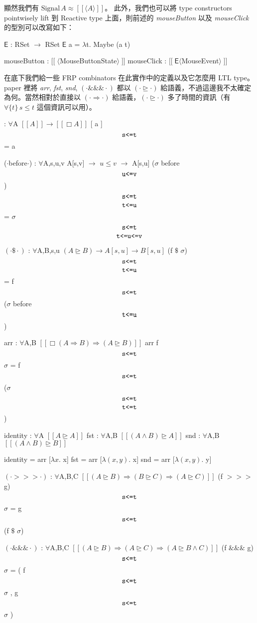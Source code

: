 \documentclass{article}
\newcommand{\llens}{[\![}
\newcommand{\rlens}{]\!]}
\newcommand{\TE}{\mathsf{E}}
\newcommand{\Wit}[1]{$\,\text{\texttt{#1}}\,$}
\newcommand{\Gs}{\sigma}
\newcommand{\Gl}{\lambda}
\begin{document}
  顯然我們有 $\text{Signal}\,A\approx \llens\langle A\rangle\rlens$。
  此外，我們也可以將 type constructors pointwisely lift 到 Reactive type
  上面，則前述的 \textit{mouseButton} 以及 \textit{mouseClick} 的型別可以改寫如下：

  \begin{code}
  $\TE$ : RSet $\to$ RSet
  $\TE$ a = $\Gl$t. Maybe (a t)

  mouseButton : $\llens\;\langle$MouseButtonState$\rangle\;\rlens$
  mouseClick   : $\llens\;\TE\langle$MouseEvent$\rangle\;\rlens$
  \end{code}

  在底下我們給一些 FRP combinators 在此實作中的定義以及它怎麼用 LTL type。
  paper 裡將 \textit{arr}, \textit{fst}, \textit{snd}, $(\cdot\&\!\&\!\&\cdot)$
  都以 $(\cdot\unrhd\cdot)$ 給語義，不過這邊我不太確定為何。當然相對於直接以
  $(\cdot\Rightarrow\cdot)$ 給語義，$(\cdot\unrhd\cdot)$ 多了時間的資訊（有
  $\forall\{t\}\,s\le t$ 這個資訊可以用）。

  \begin{minipage}[t]{\textwidth}
    \begin{minipage}[t]{0.46\textwidth}
      \begin{code}
[$\cdot$] : $\forall${A} $\llens A\rlens \to \llens\Box A\rlens$
[ a ] $\Wit{s<=t}$ = a

($\cdot$before$\cdot$) : $\forall${A,s,u,v} A[s,v] $\to$ $u\le v$ $\to$ A[s,u]
($\Gs$ before $\Wit{u<=v}$) $\Wit{s<=t}$ $\Wit{t<=u}$ = $\Gs$ $\Wit{s<=t}$ $\Wit{t<=u<=v}$

$(\cdot\$\cdot)$ : $\forall${A,B,s,u} $(A\unrhd B)\to A[s,u] \to B[s,u]$
(f $\$$ $\Gs$) $\Wit{s<=t}$ $\Wit{t<=u}$ = f $\Wit{s<=t}$ ($\Gs$ before $\Wit{t<=u}$)

arr : $\forall${A,B} $\llens\Box(A\Rightarrow B)\Rightarrow (A\unrhd B)\rlens$
arr f $\Wit{s<=t}$ $\Gs$ = f $\Wit{s<=t}$ ($\Gs$ $\Wit{s<=t}$ $\Wit{t<=t}$)
      \end{code}
    \end{minipage}
    \begin{minipage}[t]{0.54\textwidth}
      \begin{code}
identity : $\forall${A} $\llens A\unrhd A\rlens$
fst : $\forall${A,B} $\llens (A\land B) \unrhd A\rlens$
snd : $\forall${A,B} $\llens (A\land B) \unrhd B\rlens$

identity = arr [$\Gl x.$ x]
fst = arr [$\Gl(x,y).$ x]
snd = arr [$\Gl(x,y).$ y]

$(\cdot>\!\!>\!\!>\cdot)$ : $\forall${A,B,C} $\llens(A\unrhd B) \Rightarrow  (B\unrhd C)\Rightarrow (A \unrhd C)\rlens$
(f $>\!\!>\!\!>$ g) $\Wit{s<=t}$ $\Gs$ = g $\Wit{s<=t}$ (f $\$$ $\Gs$)

$(\cdot\&\!\&\!\&\cdot)$ : $\forall${A,B,C} $\llens(A\unrhd B)\Rightarrow (A\unrhd C) \Rightarrow (A \unrhd B\land C) \rlens$
(f $\&\!\&\!\&$ g) $\Wit{s<=t}$ $\Gs$ = ( f $\Wit{s<=t}$ $\Gs$ , g $\Wit{s<=t}$ $\Gs$ )
      \end{code}
    \end{minipage}
  \end{minipage}
\end{document}
